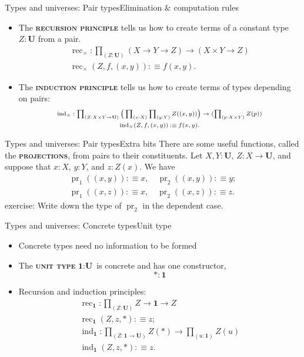 \documentclass{beamer}
\newcommand{\defn}[1]{{\scshape\bfseries\color{MPBemph}#1}}
\newcommand{\eql}{\mathbin{:\equiv}}
\newcommand{\U}{\textbf{U}}
\newcommand{\tpi}[1]{\prod_{(#1)}}
\DeclareMathOperator{\rec}{rec}
\DeclareMathOperator{\ind}{ind}
\DeclareMathOperator{\pr}{pr}
\newcommand{\1}{\textbf{1}}
\newcommand{\0}{\mathbf{0}}
\newcommand{\2}{\textbf{2}}
\begin{document}
\begin{frame}{Types and universes: Pair types}{Elimination \& computation rules}
\begin{itemize}[<+- >]
	\item The \defn{recursion principle} tells us how to create terms of a constant type \( Z : \U \) from a pair.
	\[ \begin{array}{c}
		\rec_{\times} : \tpi{Z : \U} (X \to Y \to Z) \to (X \times Y \to Z)	\\[3pt]
		\rec_{\times}(Z, f, (x, y)) \eql f(x, y).
	\end{array} \]
	\item The \defn{induction principle} tells us how to create terms of types depending on pairs:
	\[ \scriptsize\begin{array}{c}
		\ind_{\times} : \tpi{Z : X \times Y \to \U} \big(\tpi{x : X} \tpi{y : Y} Z((x, y))\big) \to (\tpi{p : X \times Y} Z(p)) \\[6pt]
		\ind_{\times}(Z, f, (x, y)) \eql f(x, y).
	\end{array} \]
\end{itemize} \end{frame}
\begin{frame}{Types and universes: Pair types}{Extra bits}
There are some useful functions, called the \defn{projections}, from pairs to their constituents. Let \( X, Y : \U \), \( Z : X \to \U \), and suppose that \( x : X \), \( y : Y \), and \( z : Z(x) \). We have
\[ \begin{array}{c}
	\pr_{1}((x, y)) \eql x, \hspace{1em} \pr_{2}((x, y)) \eql y; \\[3pt]
	\pr_{1}((x, z)) \eql x, \hspace{1em} \pr_{2}((x, z)) \eql z.
\end{array} \]
\pause
{\color{MPBexample}exercise:} Write down the type of \( \pr_{2} \) in the dependent case.
\end{frame}
\begin{frame}{Types and universes: Concrete types}{Unit type}
\begin{itemize}[<+- >]
	\item Concrete types need no information to be formed
	\item The \defn{unit type} \( \1 : \U \) is concrete and has one constructor, \[ \ast : \1 \]
	\item Recursion and induction principles:
	\[ \begin{array}{c}
		\rec_{\1} : \tpi{Z : \U} Z \to \1 \to Z \\[3pt]
		\rec_{\1}(Z, z, \ast) \eql z; \\[12pt]
		\ind_{\1} : \tpi{Z : \1 \to \U} Z(\ast) \to \tpi{u : \1} Z(u) \\[3pt]
		\ind_{\1}(Z, z, \ast) \eql z.
	\end{array} \]
\end{itemize} \end{frame}
\end{document}
